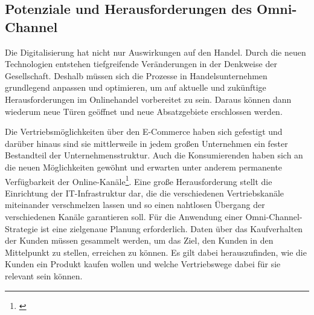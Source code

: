 \subsection{Potenziale und Herausforderungen des Omni-Channel}\label{unterabschnitt_3_5}
Die Digitalisierung hat nicht nur Auswirkungen auf den Handel. Durch die neuen Technologien entstehen tiefgreifende Veränderungen in der Denkweise der Gesellschaft. Deshalb müssen sich die Prozesse in Handelsunternehmen grundlegend anpassen und optimieren, um auf aktuelle und zukünftige Herausforderungen im Onlinehandel vorbereitet zu sein. Daraus können dann wiederum neue Türen geöffnet und neue Absatzgebiete erschlossen werden.
\newline

Die Vertriebsmöglichkeiten über den E-Commerce haben sich gefestigt und darüber hinaus sind sie mittlerweile in jedem großen Unternehmen ein fester Bestandteil der Unternehmensstruktur. Auch die Konsumierenden haben sich an die neuen Möglichkeiten gewöhnt und erwarten unter anderem permanente Verfügbarkeit der Online-Kanäle\footnote{\autocite [S. 426] {Heinemann2016}}.
\newline
Eine große Herausforderung stellt die Einrichtung der IT-Infrastruktur dar, die die verschiedenen Vertriebskanäle miteinander verschmelzen lassen und so einen nahtlosen Übergang der verschiedenen Kanäle garantieren soll.
Für die Anwendung einer Omni-Channel-Strategie ist eine zielgenaue Planung erforderlich. Daten über das Kaufverhalten der Kunden müssen gesammelt werden, um das Ziel, den Kunden in den Mittelpunkt zu stellen, erreichen zu können. Es gilt dabei herauszufinden, wie die Kunden ein Produkt kaufen wollen und welche Vertriebswege dabei für sie relevant sein können.
\newline

